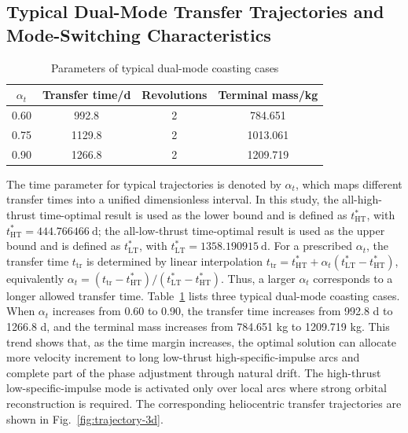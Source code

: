 ﻿\documentclass{IEEEtaes}
\begin{document}
\subsection{Typical Dual-Mode Transfer Trajectories and Mode-Switching Characteristics}

\begin{table}[!t]
\caption{Parameters of typical dual-mode coasting cases}
\label{tab:typical-cases}
\centering
\footnotesize
\begin{tabular}{cccc}
\toprule
$\alpha_t$ & Transfer time/d & Revolutions & Terminal mass/kg \\
\midrule
0.60 & 992.8 & 2 & 784.651 \\
0.75 & 1129.8 & 2 & 1013.061 \\
0.90 & 1266.8 & 2 & 1209.719 \\
\bottomrule
\end{tabular}
\end{table}

The time parameter for typical trajectories is denoted by $\alpha_t$, which maps different transfer times into a unified dimensionless interval. In this study, the all-high-thrust time-optimal result is used as the lower bound and is defined as $t_{\mathrm{HT}}^{\ast}$, with $t_{\mathrm{HT}}^{\ast}=444.766466~\mathrm{d}$; the all-low-thrust time-optimal result is used as the upper bound and is defined as $t_{\mathrm{LT}}^{\ast}$, with $t_{\mathrm{LT}}^{\ast}=1358.190915~\mathrm{d}$. For a prescribed $\alpha_t$, the transfer time $t_{\mathrm{tr}}$ is determined by linear interpolation $t_{\mathrm{tr}}=t_{\mathrm{HT}}^{\ast}+\alpha_t(t_{\mathrm{LT}}^{\ast}-t_{\mathrm{HT}}^{\ast})$, equivalently $\alpha_t=(t_{\mathrm{tr}}-t_{\mathrm{HT}}^{\ast})/(t_{\mathrm{LT}}^{\ast}-t_{\mathrm{HT}}^{\ast})$. Thus, a larger $\alpha_t$ corresponds to a longer allowed transfer time. Table~\ref{tab:typical-cases} lists three typical dual-mode coasting cases. When $\alpha_t$ increases from 0.60 to 0.90, the transfer time increases from 992.8 d to 1266.8 d, and the terminal mass increases from 784.651 kg to 1209.719 kg. This trend shows that, as the time margin increases, the optimal solution can allocate more velocity increment to long low-thrust high-specific-impulse arcs and complete part of the phase adjustment through natural drift. The high-thrust low-specific-impulse mode is activated only over local arcs where strong orbital reconstruction is required. The corresponding heliocentric transfer trajectories are shown in Fig.~\ref{fig:trajectory-3d}.
\end{document}
